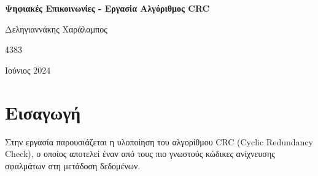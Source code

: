 \documentclass[12pt,a4paper]{article}
\begin{document}
\begin{titlepage}
    \begin{center}
        \vspace*{1cm}
        
        \Huge
        \textbf{Ψηφιακές Επικοινωνίες - Εργασία Αλγόριθμος CRC}
        
        \vspace{1.5cm}
        
        \Large
        Δεληγιαννάκης Χαράλαμπος

	\Large
	4383
        
        \vfill
        
        
        
        \Large
        Ιούνιος 2024
        
    \end{center}
\end{titlepage}

\section*{Εισαγωγή}
Στην εργασία παρουσιάζεται η υλοποίηση του αλγορίθμου CRC (Cyclic Redundancy Check), ο οποίος αποτελεί έναν από τους πιο γνωστούς κώδικες ανίχνευσης σφαλμάτων στη μετάδοση δεδομένων.
\end{document}
